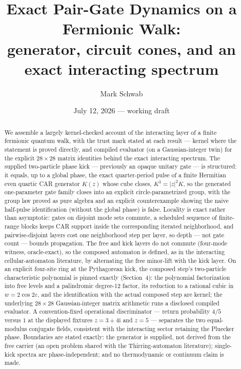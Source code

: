 \documentclass[11pt]{article}
\title{Exact Pair-Gate Dynamics on a Fermionic Walk:\\
generator, circuit cones, and an exact interacting spectrum}
\author{Mark Schwab}
\date{July 12, 2026 --- working draft}
\newcommand{\ii}{\mathrm{i}}
\begin{document}
\maketitle

\begin{abstract}
We assemble a largely kernel-checked account of the interacting layer of
a finite fermionic quantum walk, with the trust mark stated at each
result --- kernel where the statement is proved directly, and compiled
evaluator (on a Gaussian-integer twin) for the explicit $28\times28$
matrix identities behind the exact interacting spectrum.  The supplied two-particle phase kick ---
previously an opaque unitary gate --- is structured: it equals, up to a
global phase, the exact quarter-period pulse of a finite Hermitian even
quartic CAR generator $K(z)$ whose cube closes, $K^3=|z|^2K$, so the
generated one-parameter gate family closes into an explicit
circle-parametrized group, with the group law proved as pure algebra and an explicit
counterexample showing the naive half-pulse identification (without the
global phase) is false.  Locality is exact rather than asymptotic:
gates on disjoint mode sets commute, a scheduled sequence of finite-range
blocks keeps CAR support inside the corresponding iterated neighborhood,
and pairwise-disjoint layers cost one neighborhood step per layer, so
depth --- not gate count --- bounds propagation.  The free and kick
layers do not commute (four-mode witness, oracle-exact), so the composed
automaton is defined, as in the interacting
cellular-automaton literature, by alternating the free minor-lift with
the kick layer.  On an explicit four-site ring at the Pythagorean kick,
the composed step's two-particle characteristic polynomial is pinned
exactly (Section~4): the polynomial factorization into free levels and a
palindromic degree-12 factor, its reduction to a rational cubic in
$w=2\cos2\varepsilon$, and the identification with the actual composed
step are kernel; the underlying $28\times28$ Gaussian-integer matrix
arithmetic runs a disclosed compiled evaluator.  A
convention-fixed operational discriminator --- return probability $4/5$
versus $1$ at the displayed fixtures
$z=3+4\ii$ and $z=5$ --- separates the two equal-modulus conjugate
fields, consistent with the interacting sector retaining the Pluecker
phase.  Boundaries are stated exactly: the
generator is supplied, not derived from the free carrier (an open
problem shared with the Thirring-automaton literature); single-kick
spectra are phase-independent; and no thermodynamic or continuum claim
is made.
\end{abstract}
\end{document}
